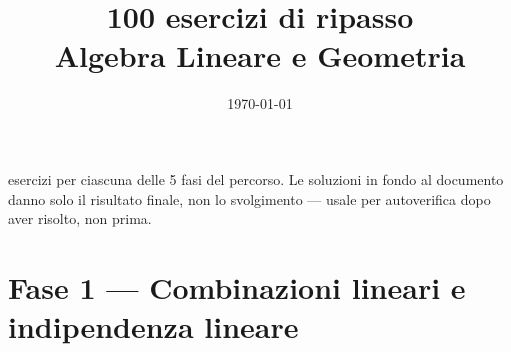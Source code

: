 \documentclass[a4paper,11pt]{article}
\title{100 esercizi di ripasso\\Algebra Lineare e Geometria}
\date{\today}
\author{}
\begin{document}
\maketitle
\thispagestyle{empty}

 esercizi per ciascuna delle 5 fasi del percorso. Le soluzioni in fondo al
documento danno solo il risultato finale, non lo svolgimento --- usale per
autoverifica dopo aver risolto, non prima.

\vspace{0.3cm}

\section{Fase 1 --- Combinazioni lineari e indipendenza lineare}
\end{document}
